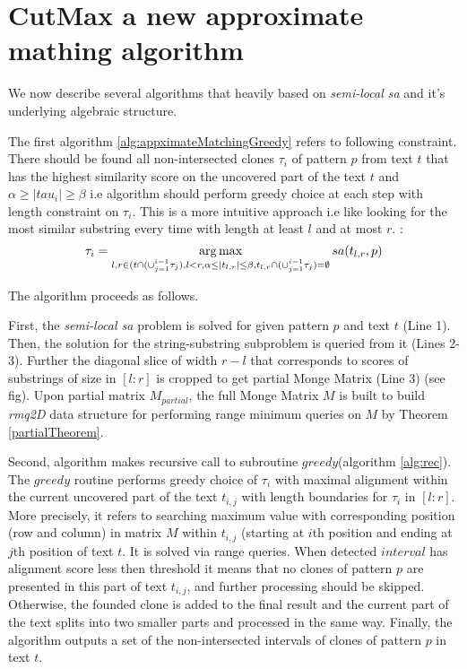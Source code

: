 \section{CutMax a new approximate mathing algorithm}
\label{section:our}
We now describe several algorithms that heavily based on \emph{semi-local sa} and it's underlying algebraic structure.

The first algorithm \ref{alg:appximateMatchingGreedy} refers to following constraint.
There should be found all non-intersected clones $\tau_{i}$ of pattern $p$ from text $t$ that has the highest similarity score on the uncovered part of the text $t$ and $\alpha \geq |tau_{i}| \geq \beta$  i.e algorithm should perform greedy choice at each step with length constraint on $\tau_{i}$.
This is a more intuitive approach i.e like looking for the most similar substring every time with length at least $l$ and at most $r$. 
:
\begin{equation}
   \tau_{i} =  \operatorname*{arg\,max}_{l,r \in (t \cap (\cup_{j=1}^{i-1} \tau_{j}),l<r, \alpha \leq |t_{l,r}| \leq \beta ,t_{l,r} \cap (\cup_{j=1}^{i-1} \tau_{j}) = \emptyset } sa(t_{l,r}, p)
\end{equation}

The algorithm proceeds as follows.

First, the \emph{semi-local sa} problem is solved for given pattern $p$ and text $t$ (Line 1).
Then, the solution for the string-substring subproblem is queried from it (Lines 2-3).
Further the diagonal slice of width $r-l$ that corresponds to
scores of substrings of size in $[l:r]$ is cropped to get partial Monge Matrix (Line 3) (see fig).
Upon partial matrix $M_{partial}$, the full Monge Matrix $M$ is built to build \emph{rmq2D} data structure  for performing range minimum queries on $M$ by Theorem \ref{partialTheorem}.

Second, algorithm makes recursive call to subroutine $greedy$(algorithm \ref{alg:rec}).
The $greedy$ routine performs greedy choice of $\tau_{i}$  with maximal alignment within the current uncovered part of the text $t_{i,j}$ with length boundaries for $\tau_{i}$ in $[l:r]$.
More precisely, it refers to searching maximum value with corresponding position (row and column) in matrix $M$ within  $t_{i,j}$ (starting at $i$th position and ending at $j$th position of text $t$.
It is solved via range queries.
When detected $interval$ has alignment score less then threshold it means that no clones of pattern $p$ are presented in this part of text $t_{i,j}$, and further processing should be skipped.
Otherwise, the founded clone is added to the final result and the current part of the text splits into two smaller parts and processed in the same way.
Finally, the algorithm outputs a set of the non-intersected intervals of clones of pattern $p$ in text $t$.


